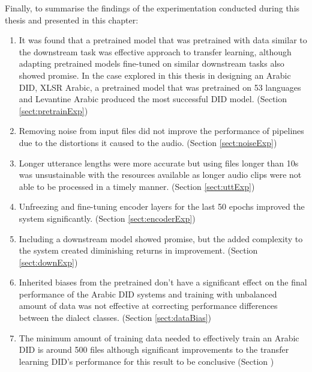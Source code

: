 Finally, to summarise the findings of the experimentation conducted during this thesis and presented in this chapter: 
\begin{enumerate}
\item It was found that a pretrained model that was pretrained with data similar to the downstream task 
was effective approach to transfer learning, although adapting pretrained models fine-tuned on similar downstream tasks also showed promise. 
In the case explored in this thesis in designing an Arabic DID, XLSR Arabic, a pretrained model that was pretrained on 53 languages and Levantine Arabic produced the most successful DID model. (Section \ref{sect:pretrainExp})
\item Removing noise from input files did not improve the performance of pipelines due to the distortions it caused to the audio. (Section \ref{sect:noiseExp})
\item Longer utterance lengths were more accurate but using files longer than 10s was unsustainable with the resources available as longer audio clips were not able to be processed in a timely manner. (Section \ref{sect:uttExp})
\item Unfreezing and fine-tuning encoder layers for the last 50 epochs improved the system significantly. (Section \ref{sect:encoderExp})
\item Including a downstream model showed promise, but the added complexity to the system created diminishing returns in improvement. (Section \ref{sect:downExp})
\item Inherited biases from the pretrained don't have a significant effect on the final performance of the Arabic DID systems and training with unbalanced amount of data 
was not effective at correcting performance differences between the dialect classes. (Section \ref{sect:dataBias})
\item The minimum amount of training data needed to effectively train an Arabic DID is around 500 files although significant improvements to the transfer learning DID's performance for this result to be conclusive (Section \label{sect:MinTrainingData})
\end{enumerate}